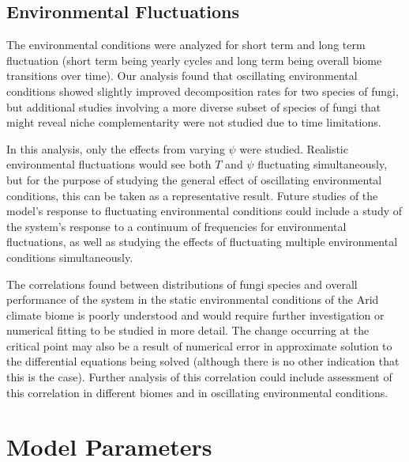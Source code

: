 \documentclass[12pt]{article}
\newenvironment{ColumnFigure}
{\par\medskip\noindent\minipage{\linewidth}}
{\endminipage\par\medskip}
\begin{document}
\begin{multicols}{2}
\subsection{Environmental Fluctuations}

The environmental conditions were analyzed for short term and long term fluctuation (short term being yearly cycles and long term being overall biome transitions over time). Our analysis found that oscillating environmental conditions showed slightly improved decomposition rates for two species of fungi, but additional studies involving a more diverse subset of species of fungi that might reveal niche complementarity were not studied due to time limitations.

In this analysis, only the effects from varying $\psi$ were studied. Realistic environmental fluctuations would see both $T$ and $\psi$ fluctuating simultaneously, but for the purpose of studying the general effect of oscillating environmental conditions, this can be taken as a representative result. Future studies of the model's response to fluctuating environmental conditions could include a study of the system's response to a continuum of frequencies for environmental fluctuations, as well as studying the effects of fluctuating multiple environmental conditions simultaneously. 

The correlations found between distributions of fungi species and overall performance of the system in the static environmental conditions of the Arid climate biome is poorly understood and would require further investigation or numerical fitting to be studied in more detail. The change occurring at the critical point may also be a result of numerical error in approximate solution to the differential equations being solved (although there is no other indication that this is the case). Further analysis of this correlation could include assessment of this correlation in different biomes and in oscillating environmental conditions. 


\end{multicols}
\newpage
\appendix
\section{Model Parameters}
\end{document}
